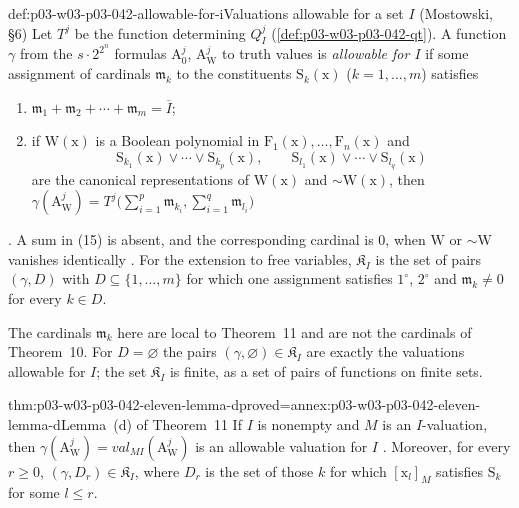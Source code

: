 \begin{hbdefinition}{def:p03-w03-p03-042-allowable-for-i}{Valuations allowable for a set \(I\) (Mostowski, \S6)}
Let \(T^j\) be the function determining \(Q^j_I\)
(\cref{def:p03-w03-p03-042-qt}).  A function \(\gamma\) from the
\(s\cdot2^{2^n}\) formulas \(\mathrm A^j_0\), \(\mathrm A^j_{\mathrm W}\)
to truth values is \emph{allowable for \(I\)} if some assignment of
cardinals \(\mathfrak m_k\) to the constituents \(\mathrm S_k(\mathrm x)\)
(\(k=1,\ldots,m\)) satisfies
\begin{enumerate}
\item[\(1^\circ\)] \(\mathfrak m_1+\mathfrak m_2+\cdots+\mathfrak
      m_m=\overline I\);
\item[\(2^\circ\)] if \(\mathrm W(\mathrm x)\) is a Boolean polynomial in
      \(\mathrm F_1(\mathrm x),\ldots,\mathrm F_n(\mathrm x)\) and
      \begin{equation*}
       \mathrm S_{k_1}(\mathrm x)\vee\cdots\vee\mathrm S_{k_p}(\mathrm x),
       \qquad
       \mathrm S_{l_1}(\mathrm x)\vee\cdots\vee\mathrm S_{l_q}(\mathrm x)
       \tag{15}
      \end{equation*}
      are the canonical representations of \(\mathrm W(\mathrm x)\) and
      \({\sim}\mathrm W(\mathrm x)\), then \(\gamma(\mathrm A^j_{\mathrm
      W})=T^j\bigl(\sum_{i=1}^p\mathfrak m_{k_i},\sum_{i=1}^q\mathfrak
      m_{l_i}\bigr)\)
\end{enumerate}
\cite[p.~33]{Mostowski1957}.  A sum in (15) is absent, and the
corresponding cardinal is \(0\), when \(\mathrm W\) or \({\sim}\mathrm
W\) vanishes identically \cite[p.~33]{Mostowski1957}.  For the extension
to free variables, \(\mathfrak K_I\) is the set of pairs \((\gamma,D)\)
with \(D\subseteq\{1,\ldots,m\}\) for which one assignment satisfies
\(1^\circ\), \(2^\circ\) and \(\mathfrak m_k\neq0\) for every \(k\in D\).
\end{hbdefinition}

The cardinals \(\mathfrak m_k\) here are local to Theorem~11 and are not
the cardinals of Theorem~10.  For \(D=\varnothing\) the pairs
\((\gamma,\varnothing)\in\mathfrak K_I\) are exactly the valuations
allowable for \(I\); the set \(\mathfrak K_I\) is finite, as a set of
pairs of functions on finite sets.

\begin{hblemma}{thm:p03-w03-p03-042-eleven-lemma-d}{proved=annex:p03-w03-p03-042-eleven-lemma-d}{Lemma~(d) of Theorem~11}
If \(I\) is nonempty and \(M\) is an \(I\)-valuation, then
\(\gamma(\mathrm A^j_{\mathrm W})=\mathit{val}_{MI}(\mathrm A^j_{\mathrm
W})\) is an allowable valuation for \(I\) \cite[p.~33]{Mostowski1957}.
Moreover, for every \(r\geq0\), \((\gamma,D_r)\in\mathfrak K_I\), where
\(D_r\) is the set of those \(k\) for which \([\mathrm x_l]_M\) satisfies
\(\mathrm S_k\) for some \(l\leq r\).
\end{hblemma}

